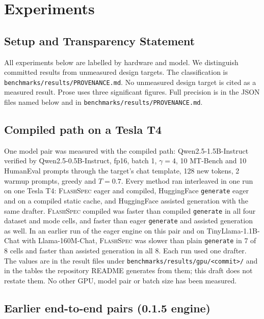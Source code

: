 \documentclass[11pt]{article}
\newcommand{\flashspec}{\textsc{FlashSpec}}
\begin{document}
\section{Experiments}
\label{sec:experiments}

\subsection{Setup and Transparency Statement}

All experiments below are labelled by hardware and model.
We distinguish committed results from unmeasured design targets.
The classification is \texttt{benchmarks/results/PROVENANCE.md}.
No unmeasured design target is cited as a measured result.
Prose uses three significant figures.
Full precision is in the JSON files named below and in
\texttt{benchmarks/results/PROVENANCE.md}.

\subsection{Compiled path on a Tesla T4}
\label{sec:t4compiled}

One model pair was measured with the compiled path:
Qwen2.5-1.5B-Instruct verified by Qwen2.5-0.5B-Instruct, fp16, batch 1,
$\gamma=4$, 10 MT-Bench and 10 HumanEval prompts through the target's
chat template, 128 new tokens, 2 warmup prompts, greedy and $T=0.7$.
Every method ran interleaved in one run on one Tesla T4: \flashspec{}
eager and compiled, HuggingFace \texttt{generate} eager and on a compiled
static cache, and HuggingFace assisted generation with the same drafter.
\flashspec{} compiled was faster than compiled \texttt{generate} in all
four dataset and mode cells, and faster than eager \texttt{generate} and
assisted generation as well.
In an earlier run of the eager engine on this pair and on
TinyLlama-1.1B-Chat with Llama-160M-Chat, \flashspec{} was slower than
plain \texttt{generate} in 7 of 8 cells and faster than assisted
generation in all 8.
Each run used one drafter.
The values are in the result files under
\texttt{benchmarks/results/gpu/<commit>/} and in the tables the
repository README generates from them; this draft does not restate them.
No other GPU, model pair or batch size has been measured.

\subsection{Earlier end-to-end pairs (0.1.5 engine)}
\label{sec:measured}
\end{document}
